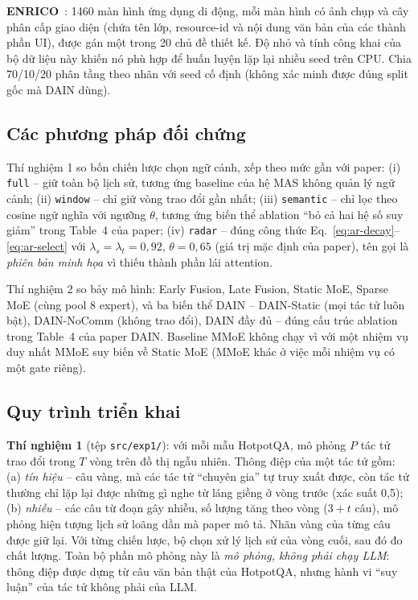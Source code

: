 \textbf{ENRICO}~\cite{leiva2020enrico}: 1460 màn hình ứng dụng di động, mỗi màn hình có ảnh chụp và cây phân cấp giao diện (chứa tên lớp, resource-id và nội dung văn bản của các thành phần UI), được gán một trong 20 chủ đề thiết kế. Độ nhỏ và tính công khai của bộ dữ liệu này khiến nó phù hợp để huấn luyện lặp lại nhiều seed trên CPU. Chia 70/10/20 phân tầng theo nhãn với seed cố định (không xác minh được đúng split gốc mà DAIN dùng).

\subsection{Các phương pháp đối chứng}
Thí nghiệm 1 so bốn chiến lược chọn ngữ cảnh, xếp theo mức gần với paper: (i) \texttt{full} -- giữ toàn bộ lịch sử, tương ứng baseline của hệ MAS không quản lý ngữ cảnh; (ii) \texttt{window} -- chỉ giữ vòng trao đổi gần nhất; (iii) \texttt{semantic} -- chỉ lọc theo cosine ngữ nghĩa với ngưỡng $\theta$, tương ứng biến thể ablation ``bỏ cả hai hệ số suy giảm'' trong Table~4 của paper; (iv) \texttt{radar} -- đúng công thức Eq.~\ref{eq:ar-decay}--\ref{eq:ar-select} với $\lambda_s=\lambda_t=0{,}92$, $\theta=0{,}65$ (giá trị mặc định của paper), tên gọi là \emph{phiên bản minh họa} vì thiếu thành phần lái attention.

Thí nghiệm 2 so bảy mô hình: Early Fusion, Late Fusion, Static MoE, Sparse MoE (cùng pool 8 expert), và ba biến thể DAIN -- DAIN-Static (mọi tác tử luôn bật), DAIN-NoComm (không trao đổi), DAIN đầy đủ -- đúng cấu trúc ablation trong Table~4 của paper DAIN. Baseline MMoE không chạy vì với một nhiệm vụ duy nhất MMoE suy biến về Static MoE (MMoE khác ở việc mỗi nhiệm vụ có một gate riêng).

\subsection{Quy trình triển khai}
\textbf{Thí nghiệm 1} (tệp \texttt{src/exp1/}): với mỗi mẫu HotpotQA, mô phỏng $P$ tác tử trao đổi trong $T$ vòng trên đồ thị ngẫu nhiên. Thông điệp của một tác tử gồm: (a) \emph{tín hiệu} -- câu vàng, mà các tác tử ``chuyên gia'' tự truy xuất được, còn tác tử thường chỉ lặp lại được những gì nghe từ láng giềng ở vòng trước (xác suất 0,5); (b) \emph{nhiễu} -- các câu từ đoạn gây nhiễu, số lượng tăng theo vòng ($3+t$ câu), mô phỏng hiện tượng lịch sử loãng dần mà paper mô tả. Nhãn vàng của từng câu được giữ lại. Với từng chiến lược, bộ chọn xử lý lịch sử của vòng cuối, sau đó đo chất lượng. Toàn bộ phần mô phỏng này là \emph{mô phỏng, không phải chạy LLM}: thông điệp được dựng từ câu văn bản thật của HotpotQA, nhưng hành vi ``suy luận'' của tác tử không phải của LLM.

